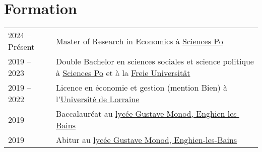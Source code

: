 \documentclass[a4paper,12pt]{article}
\begin{document}
\section{Formation}
\begin{tabularx}{\linewidth}{@{}l X@{}}	

2024 – Présent & Master of Research in Economics à \href{https://www.sciencespo.fr/en/}{Sciences Po} \\ 

2019 – 2023 & Double Bachelor en sciences sociales et science politique à \href{https://www.sciencespo.fr/en/}{Sciences Po} et à la \href{https://www.fu-berlin.de/en/index.html}{Freie Universität}\\

2019 – 2022 & Licence en économie et gestion (mention Bien) à l'\href{https://www.univ-lorraine.fr/en/}{Université de Lorraine}\\

2019 & Baccalauréat au \href{https://www.lyc-polyvalent-monod-enghien.fr/}{lycée Gustave Monod, Enghien-les-Bains} \hfill \\

2019 & Abitur au \href{https://www.lyc-polyvalent-monod-enghien.fr/}{lycée Gustave Monod, Enghien-les-Bains} \hfill \\
\end{tabularx}

\end{document}
